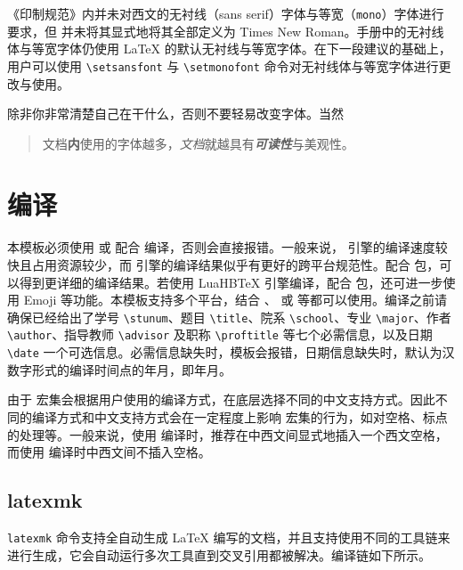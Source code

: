 \begin{notice}
    《印制规范》内并未对西文的无衬线（\textsf{sans serif}）字体与等宽（\texttt{mono}）字体进行要求，但 \WhuThesis 并未将其显式地将其全部定义为 Times New Roman。手册中的无衬线体与等宽字体仍使用 \LaTeX{} 的默认无衬线与等宽字体。在下一段建议的基础上，用户可以使用 \verb|\setsansfont| 与 \verb|\setmonofont| 命令对无衬线体与等宽字体进行更改与使用。

    除非你非常清楚自己在干什么，否则不要轻易改变字体。当然\\
    \begin{quote}
        文档\textbf{内}{\tiny 使用}的字体越{\huge \textsf{多}}，\textit{文档}就越具有\textbf{\textit{可读性}}{\large 与}{\Large 美}{\huge 观}{\Huge 性}。
    \end{quote}
\end{notice}

\section{编译}
本模板必须使用  或  配合  编译，否则会直接报错。一般来说， 引擎的编译速度较快且占用资源较少，而  引擎的编译结果似乎有更好的跨平台规范性。配合  包，可以得到更详细的编译结果。若使用 LuaHB\TeX{} 引擎编译，配合  包，还可进一步使用 Emoji 等功能。\emojitest 本模板支持多个平台，结合 、 或  等都可以使用。编译之前请确保已经给出了学号 \verb|\stunum|、题目 \verb|\title|、院系 \verb|\school|、专业 \verb|\major|、作者 \verb|\author|、指导教师 \verb|\advisor| 及职称 \verb|\proftitle| 等七个必需信息，以及日期 \verb|\date| 一个可选信息。必需信息缺失时，模板会报错，日期信息缺失时，默认为汉数字形式的编译时间点的年月，即\zhdigits{\the\year}年\zhnumber{\the\month}月。

\begin{notice}
    由于 \CTeX 宏集会根据用户使用的编译方式，在底层选择不同的中文支持方式。因此不同的编译方式和中文支持方式会在一定程度上影响 \CTeX 宏集的行为，如对空格、标点的处理等。一般来说，使用  编译时，推荐在中西文间显式地插入一个西文空格，而使用  编译时中西文间不插入空格。
\end{notice}

\subsection{latexmk}
\verb|latexmk| 命令支持全自动生成 \LaTeX{} 编写的文档，并且支持使用不同的工具链来进行生成，它会自动运行多次工具直到交叉引用都被解决。编译链如下所示。

